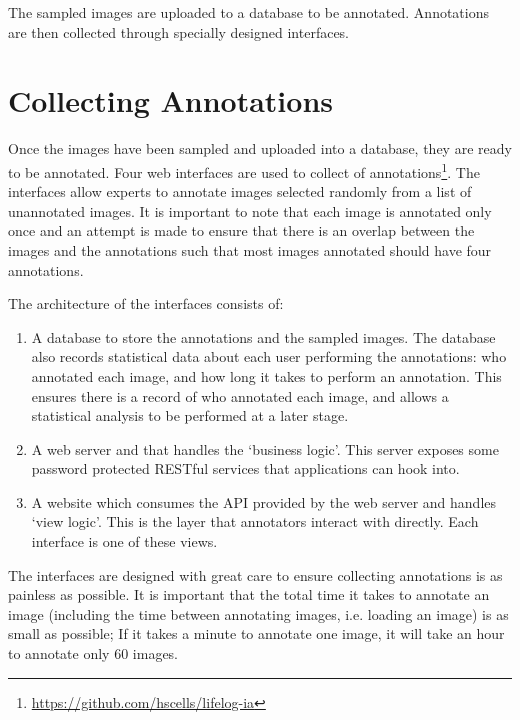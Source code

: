 The sampled images are uploaded to a database to be annotated. Annotations are then collected through specially designed interfaces.

\section{Collecting Annotations}

Once the images have been sampled and uploaded into a database, they are ready to be annotated. Four web interfaces are used to collect of annotations\footnote{\url{https://github.com/hscells/lifelog-ia}}. The interfaces allow experts to annotate images selected randomly from a list of unannotated images. It is important to note that each image is annotated only once and an attempt is made to ensure that there is an overlap between the images and the annotations such that most images annotated should have four annotations.

The architecture of the interfaces consists of:
\begin{enumerate}
    \item A database to store the annotations and the sampled images. The database also records statistical data about each user performing the annotations: who annotated each image, and how long it takes to perform an annotation. This ensures there is a record of who annotated each image, and allows a statistical analysis to be performed at a later stage.
    \item A web server and that handles the `business logic'. This server exposes some password protected RESTful services that applications can hook into.
    \item A website which consumes the API provided by the web server and handles `view logic'. This is the layer that annotators interact with directly. Each interface is one of these views.
\end{enumerate}

The interfaces are designed with great care to ensure collecting annotations is as painless as possible. It is important that the total time it takes to annotate an image (including the time between annotating images, i.e. loading an image) is as small as possible; If it takes a minute to annotate one image, it will take an hour to annotate only 60 images.


